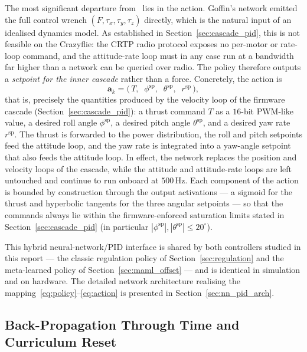 \documentclass[11pt,a4paper]{article}
\theoremstyle{remark}
\numberwithin{equation}{section}
\begin{document}
The most significant departure from~\cite{goffin2026} lies in the action. Goffin's network
emitted the full control wrench $(F, \tau_x, \tau_y, \tau_z)$ directly, which is the
natural input of an idealised dynamics model. As established in
Section~\ref{sec:cascade_pid}, this is not feasible on the Crazyflie: the CRTP radio
protocol exposes no per-motor or rate-loop command, and the attitude-rate loop must in any
case run at a bandwidth far higher than a network can be queried over radio. The policy
therefore outputs a \emph{setpoint for the inner cascade} rather than a force. Concretely,
the action is
\begin{equation}
\mathbf{a}_k = \big(\, T,\;\; \phi^{\mathrm{sp}},\;\; \theta^{\mathrm{sp}},\;\;
r^{\mathrm{sp}} \,\big),
\label{eq:action}
\end{equation}
that is, precisely the quantities produced by the velocity loop of the firmware cascade
(Section~\ref{sec:cascade_pid}): a thrust command $T$ as a $16$-bit PWM-like value, a
desired roll angle $\phi^{\mathrm{sp}}$, a desired pitch angle $\theta^{\mathrm{sp}}$, and
a desired yaw rate $r^{\mathrm{sp}}$. The thrust is forwarded to the power distribution,
the roll and pitch setpoints feed the attitude loop, and the yaw rate is integrated into a
yaw-angle setpoint that also feeds the attitude loop. In effect, the network replaces the
position and velocity loops of the cascade, while the attitude and attitude-rate loops are
left untouched and continue to run onboard at $500\,\mathrm{Hz}$. Each component of the
action is bounded by construction through the output activations --- a sigmoid for the
thrust and hyperbolic tangents for the three angular setpoints --- so that the commands
always lie within the firmware-enforced saturation limits stated in
Section~\ref{sec:cascade_pid} (in particular $|\phi^{\mathrm{sp}}|,
|\theta^{\mathrm{sp}}| \le 20^\circ$).

This hybrid neural-network/PID interface is shared by both controllers studied in this
report --- the classic regulation policy of Section~\ref{sec:regulation} and the
meta-learned policy of Section~\ref{sec:maml_offset} --- and is identical in simulation and on
hardware. The detailed network architecture realising the
mapping~\eqref{eq:policy}--\eqref{eq:action} is presented in
Section~\ref{sec:nn_pid_arch}.

\subsection{Back-Propagation Through Time and Curriculum Reset}\label{sec:bptt}
\end{document}
